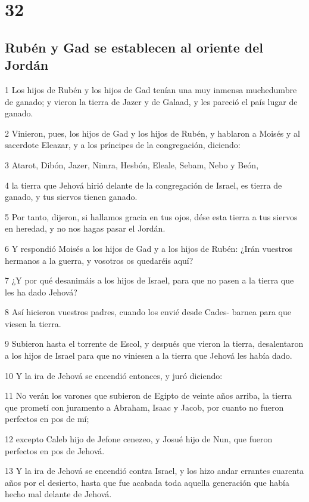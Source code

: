 \chapter{32}

\section*{Rubén y Gad se establecen al oriente del Jordán}

\par 1 Los hijos de Rubén y los hijos de Gad tenían una muy inmensa muchedumbre de ganado; y vieron la tierra de Jazer y de Galaad, y les pareció el país lugar de ganado.
\par 2 Vinieron, pues, los hijos de Gad y los hijos de Rubén, y hablaron a Moisés y al sacerdote Eleazar, y a los príncipes de la congregación, diciendo:
\par 3 Atarot, Dibón, Jazer, Nimra, Hesbón, Eleale, Sebam, Nebo y Beón,
\par 4 la tierra que Jehová hirió delante de la congregación de Israel, es tierra de ganado, y tus siervos tienen ganado.
\par 5 Por tanto, dijeron, si hallamos gracia en tus ojos, dése esta tierra a tus siervos en heredad, y no nos hagas pasar el Jordán.
\par 6 Y respondió Moisés a los hijos de Gad y a los hijos de Rubén: ¿Irán vuestros hermanos a la guerra, y vosotros os quedaréis aquí?
\par 7 ¿Y por qué desanimáis a los hijos de Israel, para que no pasen a la tierra que les ha dado Jehová?
\par 8 Así hicieron vuestros padres, cuando los envié desde Cades- barnea para que viesen la tierra.
\par 9 Subieron hasta el torrente de Escol, y después que vieron la tierra, desalentaron a los hijos de Israel para que no viniesen a la tierra que Jehová les había dado.
\par 10 Y la ira de Jehová se encendió entonces, y juró diciendo:
\par 11 No verán los varones que subieron de Egipto de veinte años arriba, la tierra que prometí con juramento a Abraham, Isaac y Jacob, por cuanto no fueron perfectos en pos de mí;
\par 12 excepto Caleb hijo de Jefone cenezeo, y Josué hijo de Nun, que fueron perfectos en pos de Jehová.
\par 13 Y la ira de Jehová se encendió contra Israel, y los hizo andar errantes cuarenta años por el desierto, hasta que fue acabada toda aquella generación que había hecho mal delante de Jehová. 
